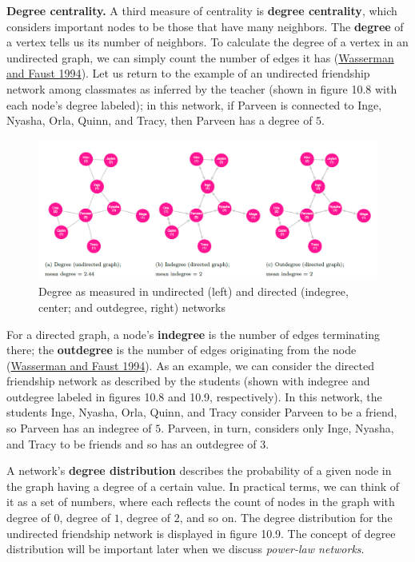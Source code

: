\documentclass{book}
\begin{document}
\textbf{Degree centrality.} A third measure of centrality is \textbf{degree
centrality}, which considers important nodes to be those that have many
neighbors. The \textbf{degree} of a vertex tells us its number of neighbors.
To calculate the degree of a vertex in an undirected graph, we can simply
count the number of edges it has
(\protect\hyperlink{ref-WassermanFaust1994}{Wasserman and Faust 1994}). Let us
return to the example of an undirected friendship network among classmates as
inferred by the teacher (shown in figure 10.8 with each node's degree
labeled); in this network, if Parveen is connected to Inge, Nyasha, Orla,
Quinn, and Tracy, then Parveen has a degree of \(5\).

\begin{figure}
\centering
\includegraphics{images/social-networks/11-8.png}
\caption{Degree as measured in undirected (left) and directed (indegree,
center; and outdegree, right) networks}
\end{figure}

For a directed graph, a node's \textbf{indegree} is the number of edges
terminating there; the \textbf{outdegree} is the number of edges originating
from the node (\protect\hyperlink{ref-WassermanFaust1994}{Wasserman and Faust
1994}). As an example, we can consider the directed friendship network as
described by the students (shown with indegree and outdegree labeled in
figures 10.8 and 10.9, respectively). In this network, the students Inge,
Nyasha, Orla, Quinn, and Tracy consider Parveen to be a friend, so Parveen has
an indegree of \(5\). Parveen, in turn, considers only Inge, Nyasha, and Tracy
to be friends and so has an outdegree of \(3\).

A network's \textbf{degree distribution} describes the probability of a given
node in the graph having a degree of a certain value. In practical terms, we
can think of it as a set of numbers, where each reflects the count of nodes in
the graph with degree of \(0\), degree of \(1\), degree of \(2\), and so on.
The degree distribution for the undirected friendship network is displayed in
figure 10.9. The concept of degree distribution will be important later when
we discuss \emph{power-law networks}.
\end{document}
